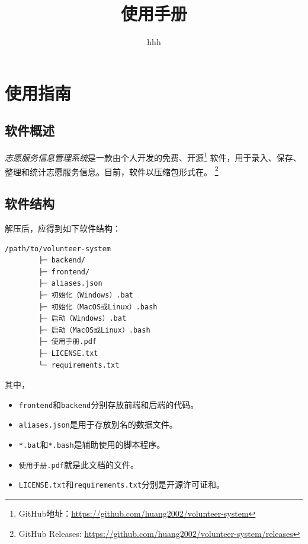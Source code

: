 \documentclass[12pt,titlepage]{article}
\title{\systemname\\使用手册\\\systemversion}
\author{hhh}
\newcommand{\systemname}{志愿服务信息管理系统}
\newcommand{\githuburl}{https://github.com/huang2002/volunteer-system}
\newcommand{\releasesurl}{\githuburl/releases}
\newcommand{\Python}{\textit{Python}}
\newcommand{\GitHub}{\textit{GitHub}}
\begin{document}
 \sloppy

\maketitle

\tableofcontents
\thispagestyle{empty}
\setcounter{page}{0}

\pagestyle{headings}

\newpage
\section{使用指南}

\subsection{软件概述}

\textit{\systemname}是一款由个人开发的免费、开源\footnote{GitHub地址：\url{\githuburl}}
软件，用于录入、保存、整理和统计志愿服务信息。目前，软件以压缩包形式在。
\footnote{GitHub Releases: \url{\releasesurl}}

\subsection{软件结构}

解压后，应得到如下软件结构：

\begin{verbatim}
/path/to/volunteer-system
        ├─ backend/
        ├─ frontend/
        ├─ aliases.json
        ├─ 初始化（Windows）.bat
        ├─ 初始化（MacOS或Linux）.bash
        ├─ 启动（Windows）.bat
        ├─ 启动（MacOS或Linux）.bash
        ├─ 使用手册.pdf
        ├─ LICENSE.txt
        └─ requirements.txt
\end{verbatim}

其中，

\begin{itemize}
    \item \texttt{frontend}和\texttt{backend}分别存放前端和后端的代码。
    \item \texttt{aliases.json}是用于存放别名的数据文件。
    \item \texttt{*.bat}和\texttt{*.bash}是辅助使用的脚本程序。
    \item \texttt{使用手册.pdf}就是此文档的文件。
    \item \texttt{LICENSE.txt}和\texttt{requirements.txt}分别是开源许可证和。
\end{itemize}
\end{document}

